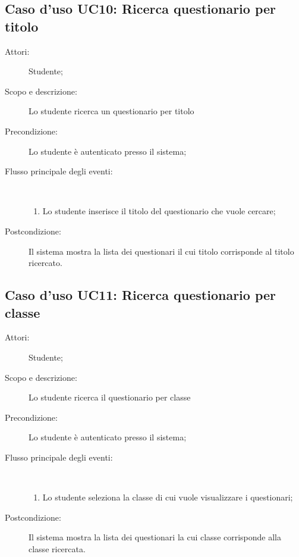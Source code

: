 \subsection{Caso d'uso UC10: Ricerca questionario per titolo}\begin{description}
\item[Attori:] Studente;
\item[Scopo e descrizione:] Lo studente ricerca un questionario per titolo
      \item[Precondizione:] Lo studente è autenticato presso il sistema;

        \item[Flusso principale degli eventi:] \ 
 \begin{enumerate}
          \item Lo studente inserisce il titolo del questionario che vuole cercare;

      \end{enumerate}
    \item[Postcondizione:] Il sistema mostra la lista dei questionari il cui titolo corrisponde al titolo ricercato.
  \end{description}
\hypertarget{UC11}{}
\subsection{Caso d'uso UC11: Ricerca questionario per classe}\begin{description}
\item[Attori:] Studente;
\item[Scopo e descrizione:] Lo studente ricerca il questionario per classe
      \item[Precondizione:] Lo studente è autenticato presso il sistema;

        \item[Flusso principale degli eventi:] \ 
 \begin{enumerate}
          \item Lo studente seleziona la classe di cui vuole visualizzare i questionari;

      \end{enumerate}
    \item[Postcondizione:] Il sistema mostra la lista dei questionari la cui classe corrisponde alla classe ricercata.
  \end{description}
\hypertarget{UC12}{}
